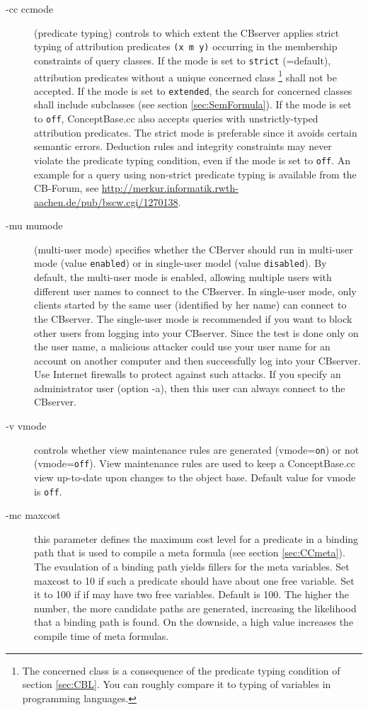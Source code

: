 \begin{description}
\item[-cc ccmode] (predicate typing) controls to which extent the CBserver
applies strict typing of
attribution predicates {\tt (x m y)} occurring in the membership constraints
of query classes.
If the mode is set to {\tt strict} (=default), attribution predicates without a unique
concerned class%
\footnote{The concerned class is a consequence of the predicate typing condition
of section \ref{sec:CBL}. You can roughly compare it to typing of variables
in programming languages.}
shall not be accepted.
If the mode is set to {\tt extended}, the search for concerned classes shall include
subclasses (see section \ref{sec:SemFormula}). 
If the mode is set to {\tt off}, ConceptBase.cc
also accepts queries with unstrictly-typed attribution predicates.
The strict mode is preferable since it avoids certain semantic errors.
Deduction rules and integrity constraints may never violate the
predicate typing condition, even if the mode is set to {\tt off}.
An example for a query using non-strict predicate typing is available from 
the CB-Forum, see \url{http://merkur.informatik.rwth-aachen.de/pub/bscw.cgi/1270138}.

\item[-mu mumode] (multi-user mode) specifies whether the CBerver should
run in multi-user mode (value {\tt enabled}) or in single-user model (value {\tt disabled}).
By default, the multi-user mode is enabled, allowing multiple users with different user
names to connect to the CBserver. In single-user mode, only clients started
by the same user (identified by her name) can connect to the CBserver.
The single-user mode is recommended if you want to block other users from logging
into your CBserver. Since the test is done only on the user name, a malicious
attacker could use your user name for an account on another computer and then
successfully log into your CBserver. Use Internet firewalls to protect
against such attacks. If you specify an administrator user (option -a), then
this user can always connect to the CBserver.

\item[-v vmode] controls whether view maintenance rules are generated (vmode={\tt on})
or not (vmode={\tt off}). View maintenance rules are used to keep a ConceptBase.cc
view up-to-date upon changes to the object base. Default value for vmode is {\tt off}.

\item[-mc maxcost] this parameter defines the maximum cost level for a predicate in a 
binding path that is used to compile a meta formula (see section \ref{sec:CCmeta}). 
The evaulation of a binding path yields fillers for the meta variables. Set maxcost to
10 if such a predicate should have about one free variable. Set it to 100 if
if may have two free variables. Default is 100. The higher the number, the more
candidate paths are generated, increasing the likelihood that a binding path is 
found. On the downside, a high value increases the compile time of meta formulas.


\end{description}
